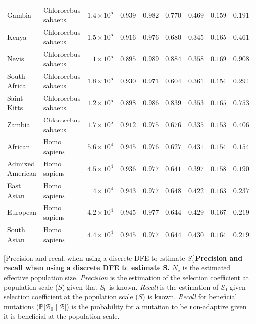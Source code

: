 \documentclass{article}
\newcommand{\Ne}{N_{\text{e}}}
\newcommand{\proba}{\mathbb{P}}
\newcommand{\Sphy}{S_{0}}
\newcommand{\SphyBen}{\mathcal{B}_0}
\newcommand{\given}{\mid}
\newcommand{\Spop}{S}
\newcommand{\SpopBen}{\mathcal{B}}
\begin{document}
\begin{center}
\begin{adjustbox}{width=\textwidth}
\begin{tabular}{||l|l|r||r|r||r|r||r|r||}
                \rowcolor{LIGHTGREY} Gambia & Chlorocebus sabaeus & $1.4\times 10^{5}$ & $ 0.939$ & $ 0.982$ & $ 0.770$ & $ 0.469$ & $ 0.159$ & $ 0.191$ \\
                \rowcolor{LIGHTGREY} Kenya & Chlorocebus sabaeus & $1.5\times 10^{5}$ & $ 0.916$ & $ 0.976$ & $ 0.680$ & $ 0.345$ & $ 0.165$ & $ 0.461$ \\
                \rowcolor{LIGHTGREY} Nevis & Chlorocebus sabaeus & $ 1\times 10^{5}$ & $ 0.895$ & $ 0.989$ & $ 0.884$ & $ 0.358$ & $ 0.169$ & $ 0.908$ \\
                \rowcolor{LIGHTGREY} South Africa & Chlorocebus sabaeus & $1.8\times 10^{5}$ & $ 0.930$ & $ 0.971$ & $ 0.604$ & $ 0.361$ & $ 0.154$ & $ 0.294$ \\
                \rowcolor{LIGHTGREY} Saint Kitts & Chlorocebus sabaeus & $1.2\times 10^{5}$ & $ 0.898$ & $ 0.986$ & $ 0.839$ & $ 0.353$ & $ 0.165$ & $ 0.753$ \\
                \rowcolor{LIGHTGREY} Zambia & Chlorocebus sabaeus & $1.7\times 10^{5}$ & $ 0.912$ & $ 0.975$ & $ 0.676$ & $ 0.335$ & $ 0.153$ & $ 0.406$ \\
                African & Homo sapiens & $5.6\times 10^{4}$ & $ 0.945$ & $ 0.976$ & $ 0.627$ & $ 0.431$ & $ 0.154$ & $ 0.154$ \\
                Admixed American & Homo sapiens & $4.5\times 10^{4}$ & $ 0.936$ & $ 0.977$ & $ 0.641$ & $ 0.397$ & $ 0.158$ & $ 0.190$ \\
                East Asian & Homo sapiens & $ 4\times 10^{4}$ & $ 0.943$ & $ 0.977$ & $ 0.648$ & $ 0.422$ & $ 0.163$ & $ 0.237$ \\
                European & Homo sapiens & $4.2\times 10^{4}$ & $ 0.945$ & $ 0.977$ & $ 0.644$ & $ 0.429$ & $ 0.167$ & $ 0.219$ \\
                South Asian & Homo sapiens & $4.4\times 10^{4}$ & $ 0.945$ & $ 0.977$ & $ 0.644$ & $ 0.430$ & $ 0.164$ & $ 0.219$ \\
                \bottomrule
            \end{tabular}
        \end{adjustbox}
        [Precision and recall when using a discrete DFE to estimate $\Spop$.]{\textbf{Precision and recall when using a discrete DFE to estimate $\bm{\Spop}$.}
        $\Ne$ is the estimated effective population size.
        \textit{Precision} is the estimation of the selection coefficient at population scale ($\Spop$) given that $\Sphy$ is known.
        \textit{Recall} is the estimation of $\Sphy$ given selection coefficient at the population scale ($\Spop$) is known.
        \textit{Recall} for beneficial mutations ($\proba{[}\SphyBen \given \SpopBen{]}$) is the probability for a mutation to be non-adaptive given it is beneficial at the population scale.\label{table:discrete-dfe}}
    \end{center}

    \newpage

    \printbibliography
\end{document}
